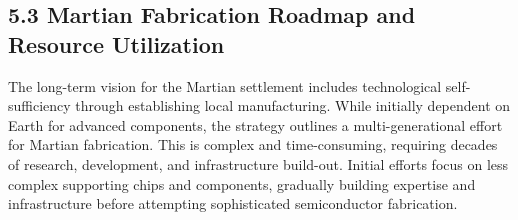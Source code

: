 \documentclass[fontsize=10pt, oneside, DIV=calc]{scrartcl}
\begin{document}
\begin{comment}
@startuml
!theme minty
scale 1.6

skinparam defaultFontColor black
skinparam backgroundColor white


title ``Radiation Hardening\nMartian Components''

rectangle ``Mars Rad Env'' as Env
rectangle ``Component Damage'' as Damage
rectangle ``Damage Types\n(TID, SEE, DD)'' as DamageTypes

rectangle ``Radiation Hardening'' as Hardening
rectangle ``Physical Shielding'' as Shielding
rectangle ``Design Process Tech'' as DesignTech

rectangle ``System Reliability'' as Reliability
rectangle ``Systemic Expansion'' as Expansion

Env --> Damage : ``Causes''
Damage --> DamageTypes

Hardening --> Shielding : ``Includes''
Hardening --> DesignTech : ``Includes''

Shielding --> Damage : ``Counters''
DesignTech --> Damage : ``Counters''

Hardening --> Reliability : ``Ensures''
Reliability --> Expansion : ``Enables''

note right of Shielding
  Regolith
  Engineered
end note

note right of DesignTech
  Layouts
  Redundancy
  Materials
end note

note left of Damage
  Impacts
  Electronics
end note

note left of Reliability
  Uptime
  Longevity
end note

@enduml
\end{comment}




\subsection*{5.3 Martian Fabrication Roadmap and Resource Utilization}



The long-term vision for the Martian settlement includes technological self-sufficiency through establishing local manufacturing. While initially dependent on Earth for advanced components, the strategy outlines a multi-generational effort for Martian fabrication. This is complex and time-consuming, requiring decades of research, development, and infrastructure build-out. Initial efforts focus on less complex supporting chips and components, gradually building expertise and infrastructure before attempting sophisticated semiconductor fabrication.
\end{document}
